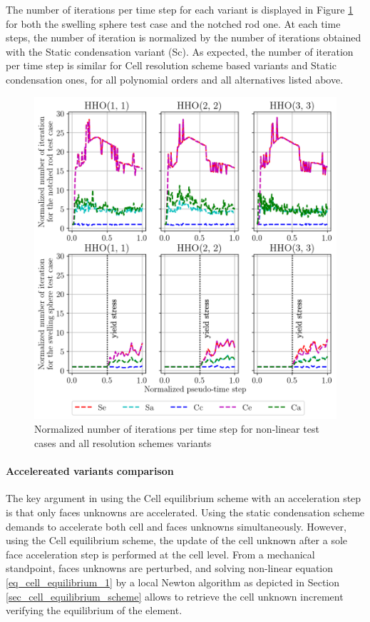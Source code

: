The number of iterations per time step for each variant
is displayed in Figure \ref{fig_acceleration_res_0} for both the swelling sphere test case
and the notched rod one.
At each time steps, the number of iteration is normalized by the number of iterations obtained with the
Static condensation variant (Sc).
As expected, the number of iteration per time step is similar for Cell resolution scheme based variants and Static condensation ones, for all polynomial orders and all alternatives listed above.

\begin{figure}[H]
    \centering
    \includegraphics[width=12.cm]{../chapter_01_hho_mechanics/figures/plot_global_iterations__4_ordn.png}
    \caption{Normalized number of iterations per time step for non-linear test cases and all resolution schemes variants}
    \label{fig_acceleration_res_0}
\end{figure}

\paragraph{Accelereated variants comparison}

The key argument in using the
Cell equilibrium scheme with an acceleration step is that 
only faces unknowns are accelerated.
Using the static condensation scheme demands to accelerate both cell and faces unknowns simultaneously.
However, using the Cell equilibrium scheme, the update of the cell unknown after a sole face acceleration step is performed at the cell level.
From a mechanical standpoint, faces unknowns are perturbed, and solving non-linear equation \eqref{eq_cell_equilibrium_1} by a local Newton algorithm as depicted in Section \ref{sec_cell_equilibrium_scheme} allows to retrieve the cell unknown increment verifying the equilibrium of the element.

